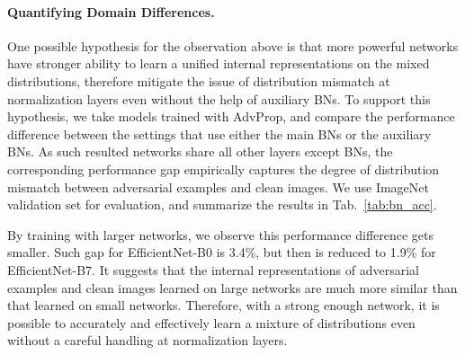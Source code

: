 \documentclass[10pt,twocolumn,letterpaper]{article}
\begin{document}
\paragraph{Quantifying Domain Differences.}
One possible hypothesis for the observation above is that more powerful networks have stronger ability to learn a unified internal representations on the mixed distributions, therefore mitigate the issue of distribution mismatch at normalization layers even without the help of auxiliary BNs. To support this hypothesis, we take models trained with AdvProp, and compare the performance difference between the settings that use either the main BNs or the auxiliary BNs. As such resulted networks share all other layers except BNs, the corresponding performance gap empirically
captures the degree of distribution mismatch between adversarial examples and clean images. 
We use ImageNet validation set for evaluation, and summarize the results in Tab.~\ref{tab:bn_acc}.


\begin{table}[h!]
\centering
\vspace{-0.85em}
\caption{Performance comparison between settings that use either the main BNs and auxiliary BNs on ImageNet.  This performance difference captures the degree of distribution mismatch between adversarial examples and clean images.}
\label{tab:bn_acc}
\vspace{-0.8em}
\end{table}



By training with larger networks, we observe this performance difference gets smaller. Such gap  for EfficientNet-B0 is 3.4\%, but then is reduced to 1.9\% for EfficientNet-B7. It suggests that the internal representations of adversarial examples and clean images learned on large networks are much more similar than that learned on small networks. Therefore, with a strong enough network, it is possible to accurately and effectively learn a mixture of distributions even without a careful handling at normalization layers.
\end{document}
